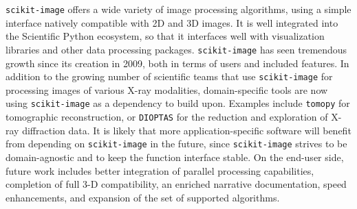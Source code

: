 \documentclass[twocolumn]{bmcart}%
\begin{document}
\texttt{scikit-image} offers a wide variety of image processing
algorithms, using a simple interface natively compatible with 2D and 3D
images. It is well integrated into the Scientific Python ecosystem, so
that it interfaces well with visualization libraries and other data
processing packages. \texttt{scikit-image} has seen tremendous growth
since its creation in 2009, both in terms of users and included features.
In addition to the growing number of scientific teams that use
\texttt{scikit-image} for processing images of various X-ray modalities,
domain-specific tools are now using \texttt{scikit-image} as a dependency
to build upon. Examples include \texttt{tomopy} \citep{Gursoy2014} for
tomographic reconstruction, or \texttt{DIOPTAS} \citep{Prescher2015} for
the reduction and exploration of X-ray diffraction data. It is likely
that more application-specific software will benefit from depending on
\texttt{scikit-image} in the future, since \texttt{scikit-image} strives
to be domain-agnostic and to keep the function interface stable. On the end-user
side, future work includes better integration of parallel processing
capabilities, completion of full 3-D compatibility, an enriched narrative
documentation, speed enhancements, and expansion of the set of supported algorithms.

\end{document}
